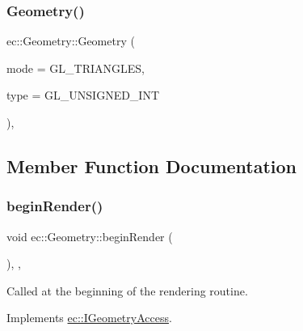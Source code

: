 \mbox{\label{classec_1_1_geometry_aeae22c6b54c7c534249ee08b3fb77a70}} 
\subsubsection{\texorpdfstring{Geometry()}{Geometry()}}
{\footnotesize\ttfamily ec\+::\+Geometry\+::\+Geometry (\begin{DoxyParamCaption}\item[{G\+Lenum}]{mode = {\ttfamily GL\+\_\+TRIANGLES},  }\item[{G\+Lenum}]{type = {\ttfamily GL\+\_\+UNSIGNED\+\_\+INT} }\end{DoxyParamCaption})\hspace{0.3cm}{\ttfamily [explicit]}, {\ttfamily [protected]}}



\subsection{Member Function Documentation}
\mbox{\label{classec_1_1_geometry_aeca5f0e52e7c2e4b352ede1a6e7c3f5b}} 
\subsubsection{\texorpdfstring{begin\+Render()}{beginRender()}}
{\footnotesize\ttfamily void ec\+::\+Geometry\+::begin\+Render (\begin{DoxyParamCaption}{ }\end{DoxyParamCaption})\hspace{0.3cm}{\ttfamily [override]}, {\ttfamily [protected]}, {\ttfamily [virtual]}}

Called at the beginning of the rendering routine. 

Implements \mbox{\hyperlink{classec_1_1_i_geometry_access_a17a87aca44e2a23a6185e78262e02652}{ec\+::\+I\+Geometry\+Access}}.

\mbox{\label{classec_1_1_geometry_ae0352702162501df185517e84c3b02bd}} 
